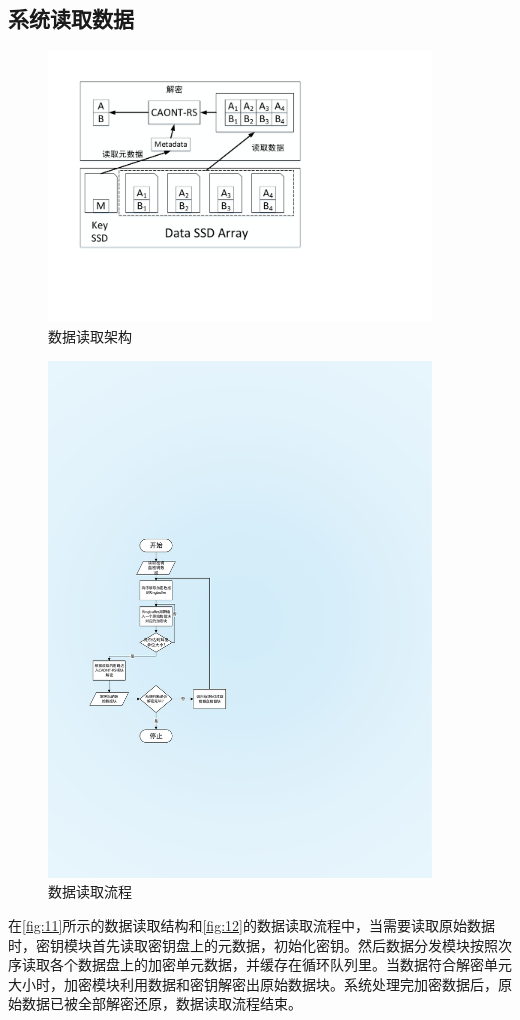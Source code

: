 \subsection{系统读取数据}
\begin{figure}[H]
	\centering
	\includegraphics[width=4in]{Pics/data-read-st.pdf}
	\caption{数据读取架构}
    \label{fig:11}
\end{figure}
\begin{figure}[H]
	\centering
	\includegraphics[width=4in]{Pics/data-read-pr.pdf}
	\caption{数据读取流程}
    \label{fig:12}
\end{figure}
在\autoref{fig:11}所示的数据读取结构和\autoref{fig:12}的数据读取流程中，当需要读取原始数据时，密钥模块首先读取密钥盘上的元数据，初始化密钥。然后数据分发模块按照次序读取各个数据盘上的加密单元数据，并缓存在循环队列里。当数据符合解密单元大小时，加密模块利用数据和密钥解密出原始数据块。系统处理完加密数据后，原始数据已被全部解密还原，数据读取流程结束。
